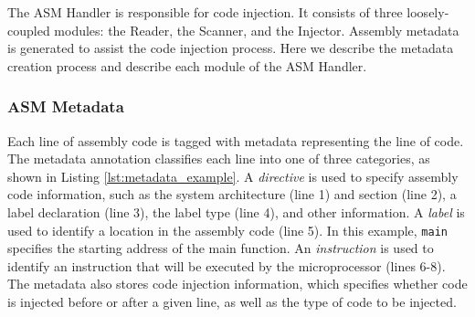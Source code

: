 The ASM Handler is responsible for code injection. It consists of three loosely-coupled modules: the Reader, the Scanner, and the Injector. Assembly metadata is generated to assist the code injection process. Here we describe the metadata creation process and describe each module of the ASM Handler.

\subsubsection{ASM Metadata}

Each line of assembly code is tagged with metadata representing the line of code. The metadata annotation classifies each line into one of three categories, as shown in Listing \ref{lst:metadata_example}. A \textit{directive} is used to specify assembly code information, such as the system architecture (line 1) and section (line 2), a label declaration (line 3), the label type (line 4), and other information. A \textit{label} is used to identify a location in the assembly code (line 5). In this example, \texttt{main} specifies the starting address of the main function. An \textit{instruction} is used to identify an instruction that will be executed by the microprocessor (lines 6-8). The metadata also stores code injection information, which specifies whether code is injected before or after a given line, as well as the type of code to be injected.

